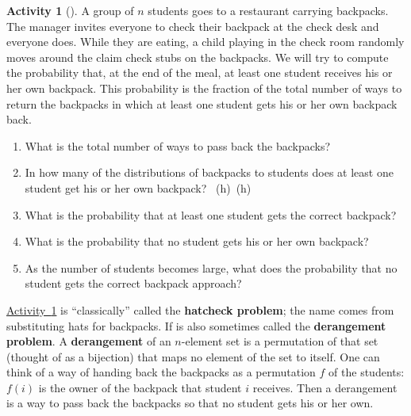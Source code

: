 \documentclass[10pt,]{book}
\newcommand{\terminology}[1]{\textbf{#1}}
\theoremstyle{plain}
\theoremstyle{definition}
\theoremstyle{definition}
\theoremstyle{definition}
\newtheorem{activity}[project]{Activity}
\numberwithin{equation}{chapter}
\begin{document}
\begin{activity}[]\label{hatcheck}
\hypertarget{p-1183}{}%
A group of \(n\) students goes to a restaurant carrying backpacks. The manager invites everyone to check their backpack at the check desk and everyone does. While they are eating, a child playing in the check room randomly moves around the claim check stubs on the backpacks. We will try to compute the probability that, at the end of the meal, at least one student receives his or her own backpack.  This probability is the fraction of the total number of ways to return the backpacks in which at least one student gets his or her own backpack back.%
\begin{enumerate}[font=\bfseries,label=(\alph*),ref=\alph*]
\item\label{task-225} \hypertarget{p-1184}{}%
What is the total number of ways to pass back the backpacks?%
\item\label{task-226} \hypertarget{p-1186}{}%
In how many of the distributions of backpacks to students does at least one student get his or her own backpack?%
~{\tiny (h)}~{\tiny (h)}\item\label{task-227} \hypertarget{p-1190}{}%
What is the probability that at least one student gets the correct backpack?%
\item\label{hatcheckprobpart} \hypertarget{p-1192}{}%
What is the probability that no student gets his or her own backpack?%
\item\label{task-229} \hypertarget{p-1194}{}%
As the number of students becomes large, what does the probability that no student gets the correct backpack approach?%
\end{enumerate}
\end{activity}
\hypertarget{p-1196}{}%
\hyperref[hatcheck]{Activity~\ref{hatcheck}} is ``classically'' called the \terminology{hatcheck problem}; the name comes from substituting hats for backpacks. If is also sometimes called the \terminology{derangement problem}. A \terminology{derangement} of an \(n\)-element set is a permutation of that set (thought of as a bijection) that maps no element of the set to itself. One can think of a way of handing back the backpacks as a permutation \(f\) of the students: \(f(i)\) is the owner of the backpack that student \(i\) receives. Then a derangement is a way to pass back the backpacks so that no student gets his or her own.%
\typeout{************************************************}
\typeout{************************************************}
\end{document}
